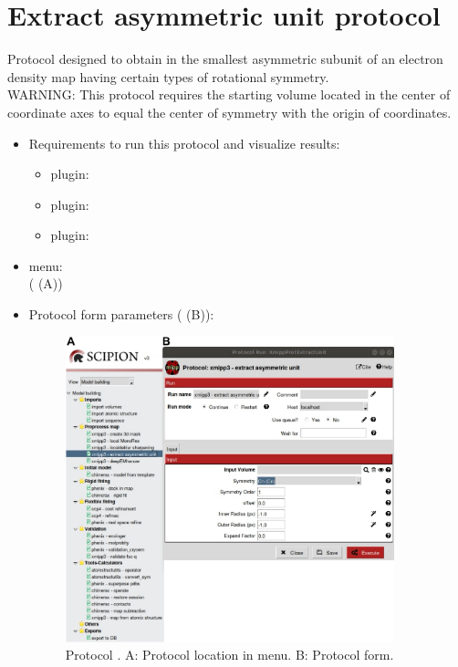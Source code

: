 \section{Extract asymmetric unit protocol}
\label{app:extractUnitCell}%
Protocol designed to obtain in \scipion the smallest asymmetric subunit of an electron density map having certain types of rotational symmetry.\\
WARNING: This protocol requires the starting volume located in the center of coordinate axes to equal the center of symmetry with the origin of coordinates.

\begin{itemize}
  \item Requirements to run this protocol and visualize results:
    \begin{itemize}
        \item \scipion plugin: 
        \item \scipion plugin: 
        \item \scipion plugin: 
    \end{itemize}
  \item \scipion menu:\\
   ( (A))
  
  \item Protocol form parameters ( (B)):
  
  \begin{figure}[H]
    \centering 
    \captionsetup{width=.9\linewidth} 
    \includegraphics[width=0.90\textwidth]{Images_appendix/Fig107.pdf}
    \caption{Protocol . A: Protocol location in \scipion menu. B: Protocol form.}
    \label{fig:app_protocol_extractUnitCell_1}
   \end{figure}
  

\end{itemize}
